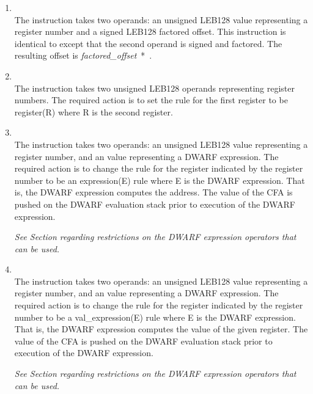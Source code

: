 \begin{enumerate}[1. ]
\item \textbf{\DWCFAvaloffsetsfTARG} \\
The \DWCFAvaloffsetsfNAME{} instruction takes two operands: an
unsigned LEB128 value representing a register number and a
signed LEB128 factored offset. This instruction is identical
to \DWCFAvaloffset{} except that the second operand is signed
and factored. The resulting offset is 
\mbox{\textit{factored\_offset} * }.

\item \textbf{\DWCFAregisterTARG} \\
The \DWCFAregisterNAME{} 
instruction takes two unsigned LEB128
operands representing register numbers. The required action
is to set the rule for the first register to be register(R)
where R is the second register.

\item \textbf{\DWCFAexpressionTARG} \\
The \DWCFAexpressionNAME{} instruction takes two operands: an
unsigned LEB128 
value representing a register number, and 
\bb
an \CLASSexprval{}
\eb
value representing a DWARF expression. 
The required action is to change the rule for the register
indicated by the register number to be an expression(E)
rule where E is the DWARF expression. That is, the DWARF
expression computes the address. The value of the CFA is
pushed on the DWARF evaluation stack prior to execution of
the DWARF expression.

\textit{See Section  
regarding restrictions on the DWARF
expression operators that can be used.}

\item \textbf{\DWCFAvalexpressionTARG} \\
The \DWCFAvalexpressionNAME{} instruction takes two operands:
an unsigned LEB128 
value representing a register number, and
\bb
an \CLASSexprval{}
\eb
value representing a DWARF expression. The
required action is to change the rule for the register
indicated by the register number to be a val\_expression(E)
rule where E is the DWARF expression. That is, the DWARF
expression computes the value of the given register. The value
of the CFA is pushed on the DWARF evaluation stack prior to
execution of the DWARF expression.

\textit{See Section  
regarding restrictions on the DWARF
expression operators that can be used.}


\end{enumerate}
